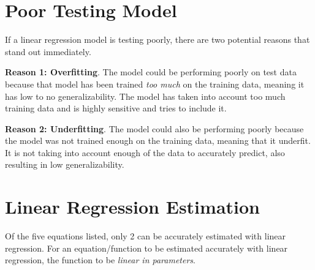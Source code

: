 \documentclass[12pt]{article}
\begin{document}
\maketitlepage

\section{Poor Testing Model}

If a linear regression model is testing poorly, there are two potential reasons that stand out immediately. 

\textbf{Reason 1: Overfitting}. The model could be performing poorly on test data because that model has been trained \textit{too much} on the training data, meaning it has low to no generalizability. The model has taken into account too much training data and is highly sensitive and tries to include it.

\textbf{Reason 2: Underfitting}. The model could also be performing poorly because the model was not trained enough on the training data, meaning that it underfit. It is not taking into account enough of the data to accurately predict, also resulting in low generalizability.

\section{Linear Regression Estimation}

Of the five equations listed, only 2 can be accurately estimated with linear regression. For an equation/function to be estimated accurately 
with linear regression, the function to be \textit{linear in parameters}.
\end{document}
